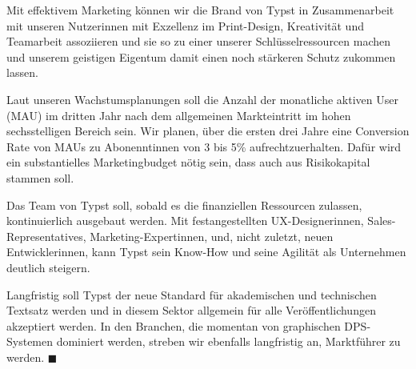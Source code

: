 \documentclass[11pt, a4paper]{article}
\newcommand{\gender}{\raisebox{-.25em}{*}}
\begin{document}
Mit effektivem Marketing können wir die Brand von Typst in Zusammenarbeit mit unseren Nutzer\gender{}innen mit Exzellenz im Print-Design, Kreativität und Teamarbeit assoziieren und sie so zu einer unserer Schlüsselressourcen machen und unserem geistigen Eigentum damit einen noch stärkeren Schutz zukommen lassen.

Laut unseren Wachstumsplanungen soll die Anzahl der monatliche aktiven User (MAU) im dritten Jahr nach dem allgemeinen Markteintritt im hohen sechsstelligen Bereich sein. Wir planen, über die ersten drei Jahre eine Conversion Rate von MAUs zu Abonennt\gender{}innen von 3 bis 5\% aufrechtzuerhalten. Dafür wird ein substantielles Marketingbudget nötig sein, dass auch aus Risikokapital stammen soll.

Das Team von Typst soll, sobald es die finanziellen Ressourcen zulassen, kontinuierlich ausgebaut werden. Mit festangestellten UX-Designer\gender{}innen, Sales-Representatives, Marketing-Expert\gender{}innen, und, nicht zuletzt, neuen Entwickler\gender{}innen, kann Typst sein Know-How und seine Agilität als Unternehmen deutlich steigern.

Langfristig soll Typst der neue Standard für akademischen und technischen Textsatz werden und in diesem Sektor allgemein für alle Veröffentlichungen akzeptiert werden. In den Branchen, die momentan von graphischen DPS-Systemen dominiert werden, streben wir ebenfalls langfristig an, Marktführer zu werden.
\hfill {\color{eastern} $\blacksquare$}
\end{document}
